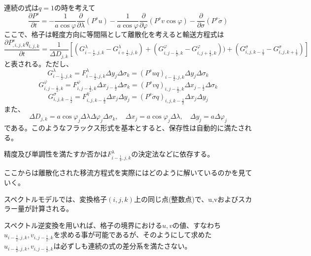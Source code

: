 \documentclass{jsbook}
\begin{document}
連続の式は$q=1$の時を考えて
\begin{equation}
  \frac{\partial P^{s}}{\partial t} = - \frac{1}{a \cos \varphi} \frac{\partial}{\partial \lambda}(P^{s}u)- \frac{1}{a \cos \varphi} \frac{\partial}{\partial \varphi}(P^{s}v \cos \varphi)- \frac{\partial}{\partial \sigma} (P^{s} \dot{\sigma})
\end{equation}
ここで、格子は軽度方向に等間隔として離散化を考えると輸送方程式は
\begin{equation}
\label{a1}
  \frac{\partial P^{s}_{,i,j,k} q_{i,j,k}}{\partial t}=\frac{1}{\Delta D_{j,k}}[(G^{\lambda}_{i-\frac{1}{2},j,k}-G^{\lambda}_{i+\frac{1}{2},j,k})+(G^{\varphi}_{i,j-\frac{1}{2},k}-G^{\varphi}_{i,j+\frac{1}{2},k}))+(G^{\sigma}_{i,j,k-\frac{1}{2}}-G^{\sigma}_{i,j,k+\frac{1}{2}})]
\end{equation}
と表される。ただし、
\begin{equation}
  G^{\lambda}_{i-\frac{1}{2},j,k}=F^{\lambda}_{i-\frac{1}{2},j,k} \Delta y_{j} \Delta \sigma_{k}=(P^{s}uq)_{i-\frac{1}{2},j,k} \Delta y_{j} \Delta \sigma_{k}
\end{equation}
\begin{equation}
  G^{\varphi}_{i,j-\frac{1}{2},k}=F^{\varphi}_{i,j-\frac{1}{2},k} \Delta x_{j-\frac{1}{2}} \Delta \sigma_{k}=(P^{s}vq)_{i,j-\frac{1}{2},k} \Delta x_{j-\frac{1}{2}} \Delta \sigma_{k}
\end{equation}
\begin{equation}
  G^{\sigma}_{i,j,k-\frac{1}{2}}=F^{\eta}_{i,j,k-\frac{1}{2}} \Delta x_{j} \Delta y_{j}=(P^{s} \dot{\sigma} q)_{i,j,k-\frac{1}{2}} \Delta x_{j} \Delta y_{j}
\end{equation}
また、
\begin{equation}
  \Delta D_{j,k}=a \cos \varphi_{j} \Delta \lambda \Delta \varphi_{j} \Delta \sigma_{k},\quad \Delta x_{j}=a \cos \varphi_{j} \Delta \lambda,\quad \Delta y_{j}=a \Delta \varphi_{j}
\end{equation}
である。このようなフラックス形式を基本とすると、保存性は自動的に満たされる。

精度及び単調性を満たすか否かは$F^{\lambda}_{i-\frac{1}{2},j,k}$の決定法などに依存する。

ここからは離散化された移流方程式を実際にはどのように解いているのかを見ていく。

スペクトルモデルでは、変換格子$(i,j,k)$上の同じ点(整数点)で、u,vおよびスカラー量が計算される。

スペクトル逆変換を用いれば、格子の境界における$u,v$の値、すなわち$u_{i-\frac{1}{2},j,k},v_{i,j-\frac{1}{2},k}$を求める事が可能であるが、そのようにして求めた$u_{i-\frac{1}{2},j,k},v_{i,j-\frac{1}{2},k}$は必ずしも連続の式の差分系を満たさない。
\end{document}
